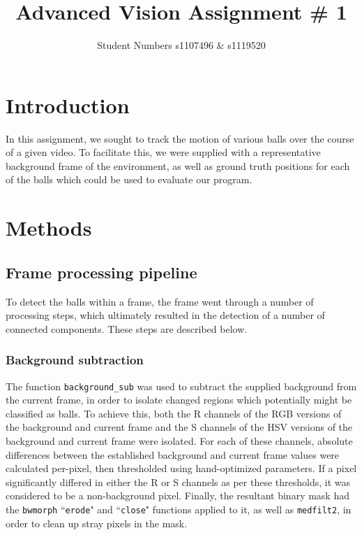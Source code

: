 \documentclass[12pt,a4paper]{article}
\begin{document}
\title{Advanced Vision Assignment \# 1}
\author{Student Numbers s1107496 \& s1119520}

\maketitle

\section{Introduction}
In this assignment, we sought to track the motion of various balls over the course of a given video. To facilitate this, we were supplied with a representative background frame of the environment, as well as ground truth positions for each of the balls which could be used to evaluate our program.

\section{Methods}

\subsection{Frame processing pipeline}
To detect the balls within a frame, the frame went through a number of processing steps, which ultimately resulted in the detection of a number of connected components. These steps are described below.
\subsubsection{Background subtraction}
The function \texttt{background\_sub} was used to subtract the supplied background from the current frame, in order to isolate changed regions which potentially might be classified as balls. To achieve this, both the R channels of the RGB versions of the background and current frame and the S channels of the HSV versions of the background and current frame were isolated. For each of these channels, absolute differences between the established background and current frame values were calculated per-pixel, then thresholded using hand-optimized parameters. If a pixel significantly differed in either the R or S channels as per these thresholds, it was considered to be a non-background pixel. Finally, the resultant binary mask had the \texttt{bwmorph} ``\texttt{erode}" and ``\texttt{close}" functions applied to it, as well as \texttt{medfilt2}, in order to clean up stray pixels in the mask. 
\end{document}
